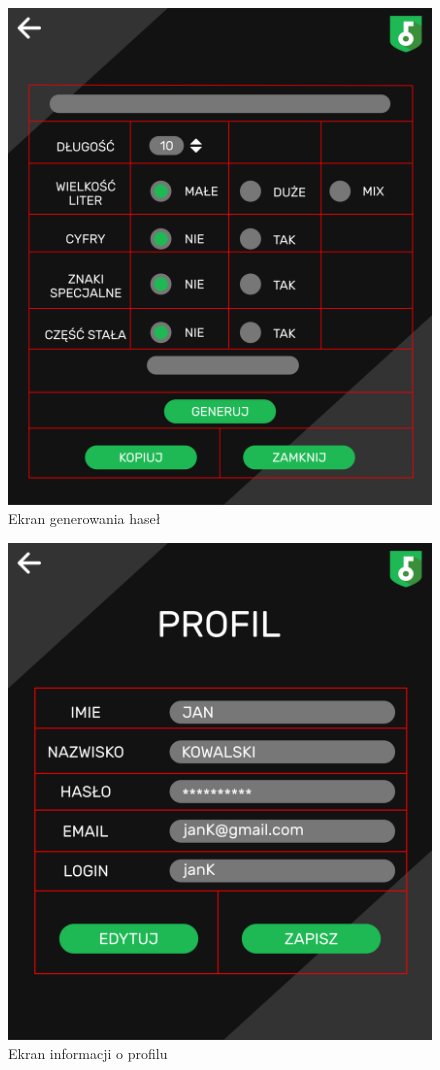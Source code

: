 \documentclass[a4paper]{article}
\begin{document}
\begin{figure}[H]
    \centering
    \includegraphics[height=1\textwidth]{img/ekran_generacji.png}
    \caption{Ekran generowania haseł}
    \label{fig:profil}
\end{figure}

\begin{figure}[H]
    \centering
    \includegraphics[height=1\textwidth]{img/ekran_profilu.png}
    \caption{Ekran informacji o profilu}
    \label{fig:profil}
\end{figure}
\end{document}
